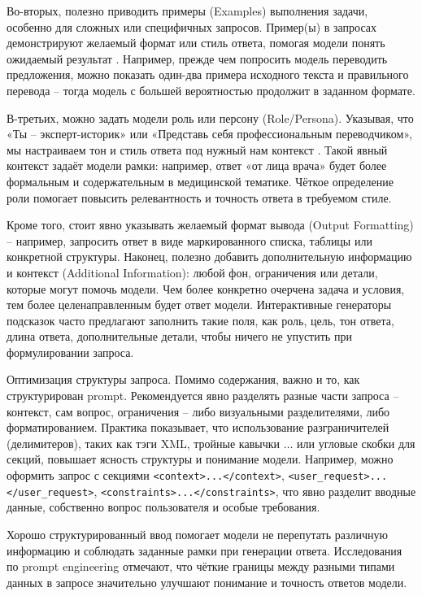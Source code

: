 Во-вторых, полезно приводить примеры (Examples) выполнения задачи, особенно для сложных или специфичных запросов. Пример(ы) в запросах демонстрируют желаемый формат или стиль ответа, помогая модели понять ожидаемый результат \cite{learnprompt:promptstructure}. Например, прежде чем попросить модель переводить предложения, можно показать один-два примера исходного текста и правильного перевода – тогда модель с большей вероятностью продолжит в заданном формате\cite{learnprompt:promptstructure}.

В-третьих, можно задать модели роль или персону (Role/Persona). Указывая, что «Ты – эксперт-историк» или «Представь себя профессиональным переводчиком», мы настраиваем тон и стиль ответа под нужный нам контекст \cite{learnprompt:promptstructure}. Такой явный контекст задаёт модели рамки: например, ответ «от лица врача» будет более формальным и содержательным в медицинской тематике. Чёткое определение роли помогает повысить релевантность и точность ответа в требуемом стиле.

Кроме того, стоит явно указывать желаемый формат вывода (Output Formatting) – например, запросить ответ в виде маркированного списка, таблицы или конкретной структуры. Наконец, полезно добавить дополнительную информацию и контекст (Additional Information): любой фон, ограничения или детали, которые могут помочь модели. Чем более конкретно очерчена задача и условия, тем более целенаправленным будет ответ модели. Интерактивные генераторы подсказок часто предлагают заполнить такие поля, как роль, цель, тон ответа, длина ответа, дополнительные детали, чтобы ничего не упустить при формулировании запроса\cite{copilotworks:promptgen}. 

Оптимизация структуры запроса. Помимо содержания, важно и то, как структурирован prompt. Рекомендуется явно разделять разные части запроса – контекст, сам вопрос, ограничения – либо визуальными разделителями, либо форматированием. Практика показывает, что использование разграничителей (делимитеров), таких как тэги XML, тройные кавычки \( \dots \) или угловые скобки для секций, повышает ясность структуры и понимание модели\cite{lakera:2025}. Например, можно оформить запрос с секциями \texttt{<context>...</context>}, \texttt{<user\_request>...</user\_request>}, \texttt{<constraints>...</constraints>}, что явно разделит вводные данные, собственно вопрос пользователя и особые требования\cite{lakera:2025}.

Хорошо структурированный ввод помогает модели не перепутать различную информацию и соблюдать заданные рамки при генерации ответа. Исследования по prompt engineering отмечают, что чёткие границы между разными типами данных в запросе значительно улучшают понимание и точность ответов модели\cite{lakera:2025}. 

